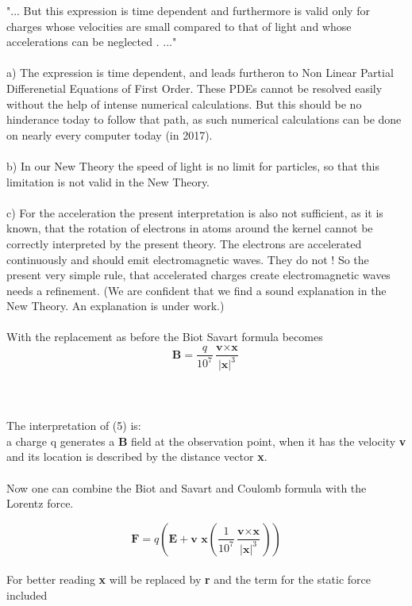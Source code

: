 \documentclass[10pt,titlepage]{article}
\begin{document}
"... But this expression is time dependent and furthermore is valid only for charges whose velocities are small compared to that of light and whose accelerations can be neglected .  ..."
\\
\\
a) The expression is time dependent, and leads furtheron to Non Linear Partial Differenetial Equations of First Order. These PDEs cannot be resolved easily without the help of intense numerical calculations. 
But this should be no hinderance today to follow that path, as such numerical calculations can be done on nearly every computer today (in 2017).
\\
\\
b) In our New Theory the speed of light is no limit for particles, so that this limitation is not valid in the New Theory. 
\\
\\
c) For the acceleration the present interpretation is also not sufficient, as it is known, that the rotation of electrons in atoms around the kernel cannot be correctly interpreted by the present theory. The electrons are accelerated continuously and should emit electromagnetic waves. They do not ! So the present very simple rule, that accelerated charges create electromagnetic waves needs a refinement. 
(We are confident that we find a sound explanation in the New Theory. An explanation is under work.)\\
\\
With the replacement as before the Biot Savart formula becomes
\begin{equation}
\textbf{B} = \frac{q}{10^7} \frac{\textbf{v} \times \textbf{x}}{\vert\textbf{x}\vert^3}
\end{equation}\\
\\
\\
The interpretation of (5) is:\\
a charge q generates a \textbf{B} field at the observation point, when it has the velocity \textbf{v} and its location is described by the distance vector \textbf{x}.
\\
\\
Now one can combine the Biot and Savart and Coulomb formula with the Lorentz force.

\begin{equation}
\textbf{F} = q(\textbf{E}+\textbf{v }\textbf{x}(\frac{1}{10^7} \frac{\textbf{v} \times \textbf{x}}{\vert\textbf{x}\vert^3}))
\end{equation}\\
For better reading \textbf{x} will be replaced by  \textbf{r} and the term for the static force included
\end{document}
